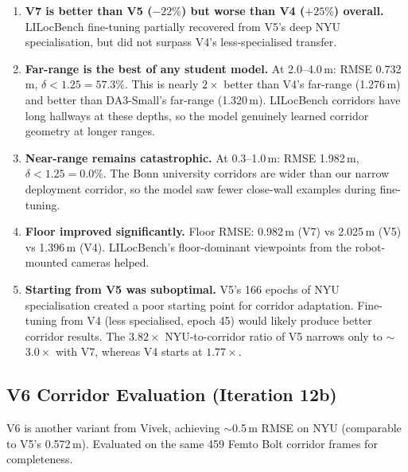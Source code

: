 \documentclass[11pt,a4paper]{article}
\begin{document}
\begin{enumerate}[nosep]
  \item \textbf{V7 is better than V5 ($-22\%$) but worse than V4 ($+25\%$) overall.}
    LILocBench fine-tuning partially recovered from V5's deep NYU specialisation,
    but did not surpass V4's less-specialised transfer.

  \item \textbf{Far-range is the best of any student model.}
    At 2.0--4.0\,m: RMSE 0.732\,m, $\delta < 1.25 = 57.3\%$. This is nearly
    $2\times$ better than V4's far-range (1.276\,m) and better than DA3-Small's
    far-range (1.320\,m). LILocBench corridors have long hallways at these depths,
    so the model genuinely learned corridor geometry at longer ranges.

  \item \textbf{Near-range remains catastrophic.}
    At 0.3--1.0\,m: RMSE 1.982\,m, $\delta < 1.25 = 0.0\%$. The Bonn university
    corridors are wider than our narrow deployment corridor, so the model saw
    fewer close-wall examples during fine-tuning.

  \item \textbf{Floor improved significantly.}
    Floor RMSE: 0.982\,m (V7) vs 2.025\,m (V5) vs 1.396\,m (V4). LILocBench's
    floor-dominant viewpoints from the robot-mounted cameras helped.

  \item \textbf{Starting from V5 was suboptimal.}
    V5's 166 epochs of NYU specialisation created a poor starting point for
    corridor adaptation. Fine-tuning from V4 (less specialised, epoch 45) would
    likely produce better corridor results. The $3.82\times$ NYU-to-corridor
    ratio of V5 narrows only to $\sim$$3.0\times$ with V7, whereas V4 starts
    at $1.77\times$.
\end{enumerate}

\subsection{V6 Corridor Evaluation (Iteration 12b)}
\label{sec:vivek-v6-corridor}

V6 is another variant from Vivek, achieving $\sim$0.5\,m RMSE on NYU
(comparable to V5's 0.572\,m). Evaluated on the same 459 Femto Bolt
corridor frames for completeness.
\end{document}
